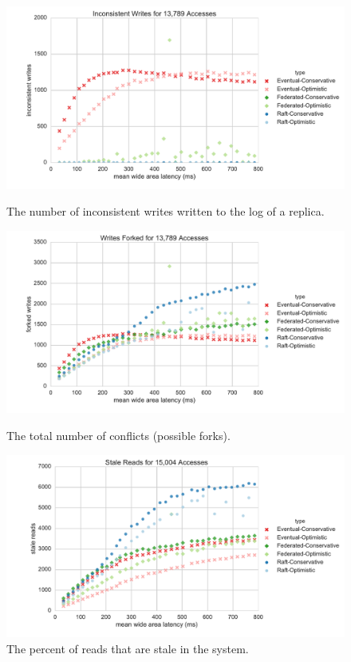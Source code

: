 \documentclass[10pt,conference,letterpaper]{IEEEtran}
\begin{document}
\begin{figure}
    \centering
      \includegraphics[width=\linewidth]{figures/latency/inconsistent_writes}
      \caption{The number of inconsistent writes written to the log of a replica.}\label{fig:latency_inconsistent_writes}
    \endminipage\hfill
      \includegraphics[width=\linewidth]{figures/latency/forked_writes}
      \caption{The total number of conflicts (possible forks).}\label{fig:latency_forked_writes}
    \endminipage\hfill
      \includegraphics[width=\linewidth]{figures/latency/stale_reads}
      \caption{The percent of reads that are stale in the system.}\label{fig:latency_stale_reads}
    \endminipage
\end{figure}
\end{document}

